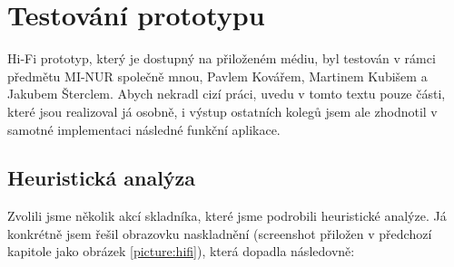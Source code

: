 \section{Testování prototypu}

Hi-Fi prototyp, který je dostupný na přiloženém médiu, byl testován v rámci předmětu MI-NUR společně mnou, Pavlem Kovářem, Martinem Kubišem a Jakubem Šterclem. Abych nekradl cizí práci, uvedu v tomto textu pouze části, které jsou realizoval já osobně, i výstup ostatních kolegů jsem ale zhodnotil v samotné implementaci následné funkční aplikace.

\subsection{Heuristická analýza}

Zvolili jsme několik akcí skladníka, které jsme podrobili heuristické analýze. Já konkrétně jsem řešil obrazovku naskladnění (screenshot přiložen v předchozí kapitole jako obrázek \ref{picture:hifi}), která dopadla následovně:

